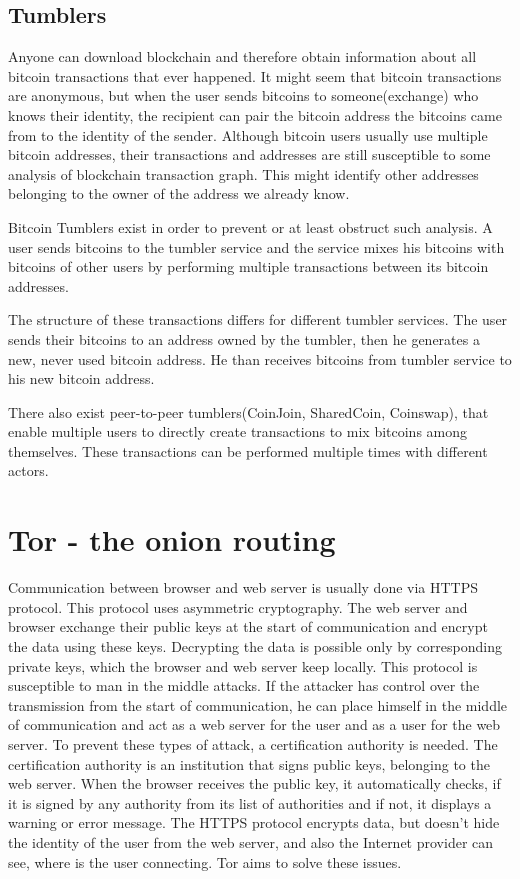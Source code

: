 \documentclass[
  digital, %
  table,   %
  lof,     %
  lot,     %
  oneside
]{fithesis3}
\begin{document}
\subsection{Tumblers}
Anyone can download blockchain and therefore obtain information about all bitcoin transactions that ever happened.
It might seem that bitcoin transactions are anonymous, but when the user sends bitcoins to
someone(exchange) who knows their identity, the recipient can pair the bitcoin address
the bitcoins came from to the identity of the sender.
Although bitcoin users usually use multiple bitcoin addresses,
their transactions and addresses are still 
susceptible to some analysis of blockchain transaction graph.
This might identify other addresses belonging to the owner of the address we already know.

Bitcoin Tumblers exist in order to prevent or at least obstruct such analysis.
A user sends bitcoins to the tumbler service and the service mixes his bitcoins
with bitcoins of other users by performing multiple transactions
between its bitcoin addresses. \parencite{moser2013inquiry}
  
The structure of these transactions differs for different tumbler services.
The user sends their bitcoins to an address owned by the tumbler,
then he generates a new, never used bitcoin address.
He than receives bitcoins from tumbler service to his new bitcoin address.

There also exist peer-to-peer tumblers(CoinJoin, SharedCoin, Coinswap),
that enable multiple users to directly create transactions to mix bitcoins among themselves.
These transactions can be performed multiple times with different actors.

\section{Tor - the onion routing}

Communication between browser and web server is usually done via HTTPS protocol.
This protocol uses asymmetric cryptography. The web server and browser exchange their public keys at the start of communication
and encrypt the data using these keys. Decrypting the data is possible only by corresponding private keys,
which the browser and web server keep locally. This protocol is susceptible to man in the middle attacks.
If the attacker has control over the transmission from the start of communication, he can place himself in the middle of communication and act as a web server for the user and as a user for the web server. To prevent these types of attack,
 a certification authority is needed. The certification authority is an institution that signs public keys, belonging to the web server.
 When the browser receives the public key, it automatically checks, if it is signed by any authority from its list of authorities and if not,
 it displays a warning or error message.
The HTTPS protocol encrypts data, but doesn't hide the identity of the user from the web server,
 and also the Internet provider can see, where is the user connecting. Tor aims to solve these issues.
 
\end{document}
